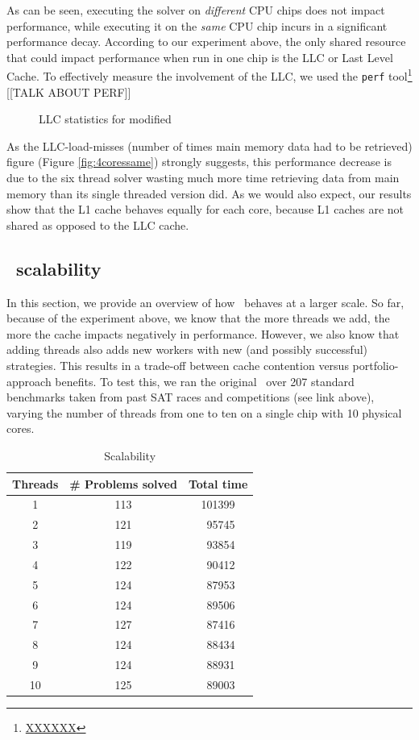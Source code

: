 As can be seen, executing the solver on {\em different} CPU chips does
not impact performance, while executing it on the {\em same} CPU chip
incurs in a significant performance decay. According to our experiment
above, the only shared resource that could impact performance when run
in one chip is the LLC or Last Level Cache. To effectively measure the
involvement of the LLC, we used the {\tt perf}
tool\footnote{\url{XXXXXX}} [[TALK ABOUT PERF]]

\begin{figure}[h]
  \centering
  \caption{LLC statistics for modified \pling}
  \label{fig:LLCStats}  
\end{figure}

As the LLC-load-misses (number of times main memory data had to be
retrieved) figure (Figure \ref{fig:4coressame}) strongly suggests,
this performance decrease is due to the six thread solver wasting
much more time retrieving data from main memory
than its single threaded version did. As we would also expect, our
results show that the L1 cache behaves equally for each core, because
L1 caches are not shared as opposed to the LLC cache.

\subsection{\pling\ scalability}

In this section, we provide an overview of how \pling\ behaves at a
larger scale. So far, because of the experiment above, we know that
the more threads we add, the more the cache impacts negatively in
performance. However, we also know that adding threads also adds new
workers with new (and possibly successful) strategies. This results in
a trade-off between cache contention versus portfolio-approach
benefits. To test this, we ran the original \pling\ over 207 standard
benchmarks taken from past SAT races and competitions (see link
above), varying the number of threads from one to ten on a single chip
with 10 physical cores.

\begin{table}[h]
  \centering
  \begin{tabular}[h]{ccc}
    \hline
    {\bf Threads} & {\bf \# Problems solved} & {\bf Total time}\\
    \hline
    1&113&101399\\
    2&121&~95745\\
    3&119&~93854\\
    4&122&~90412\\
    5&124&~87953\\
    6&124&~89506\\
    7&127&~87416\\
    8&124&~88434\\
    9&124&~88931\\
    10&125&~89003\\
    \hline
    \hline
  \end{tabular}    
  \caption{Scalability}
  \label{tab:scal}
\end{table}


